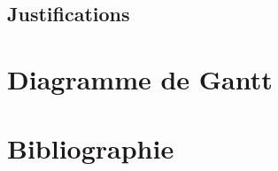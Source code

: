 \documentclass[french]{article}
\begin{document}
\subsection{Justifications}

\section{Diagramme de Gantt}

\section{Bibliographie}


\printbibliography[title={}]
\nocite{*}
\end{document}
